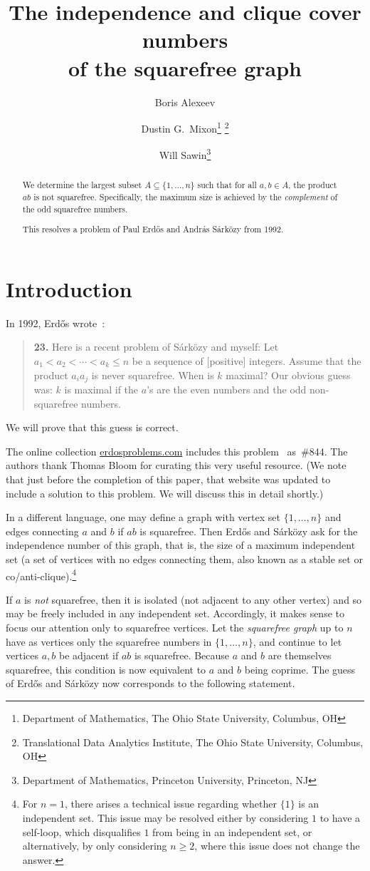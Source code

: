\documentclass{article}
\title{The independence and clique cover numbers\\of the squarefree graph}
\author{Boris Alexeev \and Dustin G.\ Mixon\thanks{Department of Mathematics, The Ohio State University, Columbus, OH} \thanks{Translational Data Analytics Institute, The Ohio State University, Columbus, OH} \and Will Sawin\thanks{Department of Mathematics, Princeton University, Princeton, NJ}}
\date{}
\theoremstyle{plain}
\theoremstyle{definition}
\theoremstyle{remark}
\newcommand{\Andras}{Andr\'as}
\newcommand{\Erdos}{Erd\H{o}s}
\newcommand{\Sarkozy}{S\'ark\"ozy}
\begin{document}
\maketitle

\begin{abstract}
We determine the largest subset $A\subseteq \{1,\dotsc,n\}$ such that for all $a,b\in A$, the product $ab$ is not squarefree.
Specifically, the maximum size is achieved by the \emph{complement} of the odd squarefree numbers.

This resolves a problem of Paul \Erdos{} and \Andras{} \Sarkozy{} from 1992.
\end{abstract}

\section{Introduction}

In 1992, \Erdos{} wrote~\cite{Er92b}:
\begin{quote}
\textbf{23.}
Here is a recent problem of \Sarkozy{} and myself: Let $a_1<a_2<\dotsb<a_k\le n$ be a sequence of [positive] integers.
Assume that the product $a_i a_j$ is never squarefree.
When is $k$ maximal?
Our obvious guess was: $k$ is maximal if the $a$'s are the even numbers and the odd non-squarefree numbers.
\end{quote}
We will prove that this guess is correct.

The online collection \url{erdosproblems.com} includes this problem~\cite{dotcom} as~\#844.
The authors thank Thomas Bloom for curating this very useful resource.
(We note that just before the completion of this paper, that website was updated to include a solution to this problem.
We will discuss this in detail shortly.)

In a different language, one may define a graph with vertex set $\{1,\ldots,n\}$ and edges connecting $a$ and $b$ if $ab$ is squarefree.
Then \Erdos{} and \Sarkozy{} ask for the independence number of this graph, that is, the size of a maximum independent set (a set of vertices with no edges connecting them, also known as a stable set or co/anti-clique).\footnote{For $n=1$, there arises a technical issue regarding whether $\{1\}$ is an independent set.  This issue may be resolved either by considering $1$ to have a self-loop, which disqualifies $1$ from being in an independent set, or alternatively, by only considering $n\geq2$, where this issue does not change the answer.}

If $a$ is \emph{not} squarefree, then it is isolated (not adjacent to any other vertex) and so may be freely included in any independent set.
Accordingly, it makes sense to focus our attention only to squarefree vertices.
Let the \emph{squarefree graph} up to $n$ have as vertices only the squarefree numbers in $\{1,\ldots,n\}$, and continue to let vertices $a,b$ be adjacent if $ab$ is squarefree.
Because $a$ and $b$ are themselves squarefree, this condition is now equivalent to $a$ and $b$ being coprime.
The guess of \Erdos{} and \Sarkozy{} now corresponds to the following statement.
\end{document}
